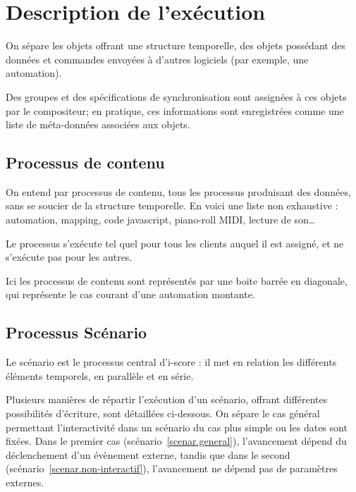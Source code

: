 \documentclass{article}
\begin{document}
\section{Description de l'exécution}\label{sec.description}
On sépare les objets offrant une structure temporelle, des objets possédant des données et commandes envoyées à d'autres logiciels (par exemple, une automation).

Des groupes et des spécifications de synchronisation sont assignées à ces objets par le compositeur; en pratique, ces informations sont enregistrées comme une liste de méta-données associées aux objets.


\subsection{Processus de contenu}
On entend par processus de contenu, tous les processus produisant des données, sans se soucier de la structure temporelle. 
En voici une liste non exhaustive : automation, mapping, code javascript, piano-roll MIDI, lecture de son\dots

Le processus s'exécute tel quel pour tous les clients auquel il est assigné, 
et ne s'exécute pas pour les autres.

Ici les processus de contenu sont représentés par une boite barrée en diagonale, qui représente le cas courant d'une automation montante.

\subsection{Processus Scénario}
Le scénario est le processus central d'i-score : il met en relation les différents éléments temporels, en parallèle et en série.

Plusieurs manières de répartir l'exécution d'un scénario, offrant différentes possibilités d'écriture, sont détaillées ci-dessous. 
On sépare le cas général permettant l'interactivité dans un scénario du cas plus simple ou les dates sont fixées.
Dans le premier cas (scénario~\ref{scenar.general}), l'avancement dépend du déclenchement d'un évènement externe, tandis que dans le second (scénario~\ref{scenar.non-interactif}), l'avancement ne dépend pas de paramètres externes. 
\end{document}
